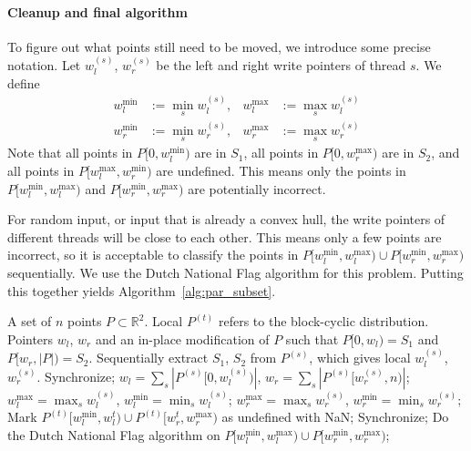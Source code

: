 \documentclass[11pt,a4paper]{article}
\begin{document}
\paragraph{Cleanup and final algorithm}
To figure out what points still need to be moved, we introduce some precise notation.
Let $w_l^{(s)}$, $w_r^{(s)}$ be the left and right write pointers of thread $s$.
We define
\begin{align*}
  w_l^{\min} &:= \min_{s} w_l^{(s)}, & w_l^{\max} &:= \max_{s} w_l^{(s)} \\
  w_r^{\min} &:= \min_{s} w_r^{(s)}, & w_r^{\max} &:= \max_{s} w_r^{(s)}
\end{align*}
Note that all points in $P[0, w_l^{\min})$ are in $S_1$, all points in $P[0, w_r^{\max})$ are in $S_2$, and all points in $P[w_l^{\max}, w_r^{\min})$ are undefined.
This means only the points in $P[w_l^{\min}, w_l^{\max})$ and $P[w_r^{\min}, w_r^{\max})$ are potentially incorrect.

For random input, or input that is already a convex hull, the write pointers of different threads will be close to each other.
This means only a few points are incorrect, so it is acceptable to classify the points in $P[w_l^{\min}, w_l^{\max}) \cup P[w_r^{\min}, w_r^{\max})$ sequentially.
We use the Dutch National Flag algorithm for this problem.
Putting this together yields Algorithm~\ref{alg:par_subset}.

\begin{algorithm}[ht]
  \begin{algorithmic}[1]
    \Require A set of $n$ points $P \subset \mathbb{R}^2$. Local $P^{(t)}$ refers to the block-cyclic distribution.
    \Ensure Pointers $w_l$, $w_r$ and an in-place modification of $P$ such that $P[0, w_l) = S_1$ and $P[w_r, |P|) = S_2$.
    \State Sequentially extract $S_1$, $S_2$ from $P^{(s)}$, which gives local $w_l^{(s)}$, $w_r^{(s)}$.
    \State Synchronize;
    \State $w_l = \sum_s |P^{(s)}[0, w_l^{(s)})|$,
           $w_r = \sum_s |P^{(s)}[w_r^{(s)}, n)|$;
    \State $w_l^{\max} = \max_s w_l^{(s)}$, $w_l^{\min} = \min_s w_l^{(s)}$;
    \State $w_r^{\max} = \max_s w_r^{(s)}$, $w_r^{\min} = \min_s w_r^{(s)}$;
    \State Mark $P^{(t)}[w_l^{\min}, w_l^{t}) \cup P^{(t)}[w_r^{t}, w_r^{\max})$ as undefined with NaN;
    \State Synchronize;
      \State Do the Dutch National Flag algorithm on $P[w_l^{\min}, w_l^{\max}) \cup P[w_r^{\min}, w_r^{\max})$;
    \EndIf
  \end{algorithmic}%
  \label{alg:par_subset}%
\end{algorithm}
\end{document}

